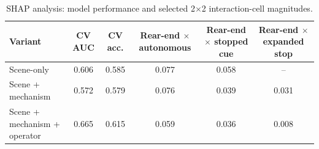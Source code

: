 \begin{table}[H]
\centering
\caption{SHAP analysis: model performance and selected 2$\times$2 interaction-cell magnitudes.}
\label{tab:shap_results}
\scriptsize
\renewcommand{\arraystretch}{1.08}
\setlength{\tabcolsep}{3pt}
\begin{tabular}{p{2.8cm}ccccc}
\toprule
Variant & CV AUC & CV acc. & \shortstack[c]{Rear-end $\times$\\ autonomous} & \shortstack[c]{Rear-end $\times$\\ stopped cue} & \shortstack[c]{Rear-end $\times$\\ expanded stop} \\
\midrule
Scene-only & 0.606 & 0.585 & 0.077 & 0.058 & -- \\
Scene + mechanism & 0.572 & 0.579 & 0.076 & 0.039 & 0.031 \\
Scene + mechanism + operator & 0.665 & 0.615 & 0.059 & 0.036 & 0.008 \\
\bottomrule
\end{tabular}
\end{table}
